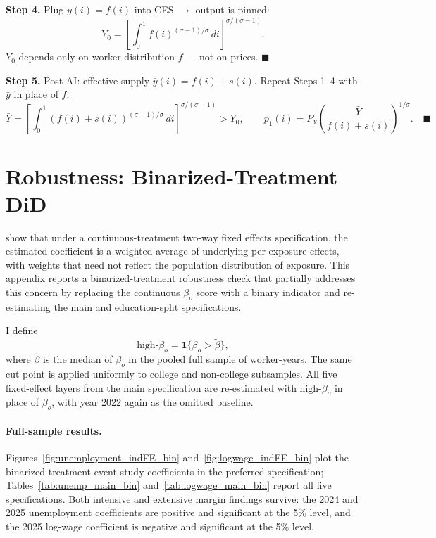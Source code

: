 \documentclass[11pt]{article}
\theoremstyle{plain}
\theoremstyle{remark}
\begin{document}
\noindent\textbf{Step 4.} Plug $y(i)=f(i)$ into CES $\to$ output is pinned:
\[
  Y_0 = \left[\int_0^1 f(i)^{(\sigma-1)/\sigma}\,di
  \right]^{\!\sigma/(\sigma-1)}.
\]
$Y_0$ depends only on worker distribution $f$ --- not on prices. $\blacksquare$

\medskip\noindent\textbf{Step 5.} Post-AI: effective supply
$\bar y(i)=f(i)+s(i)$.  Repeat Steps 1--4 with $\bar y$ in place of $f$:
\[
  \bar Y = \left[\int_0^1 (f(i)+s(i))^{(\sigma-1)/\sigma}\,di
  \right]^{\!\sigma/(\sigma-1)} > Y_0,
  \qquad
  p_1(i) = P_Y\!\left(\frac{\bar Y}{f(i)+s(i)}\right)^{\!1/\sigma}.
  \quad\blacksquare
\]


\clearpage
\section{Robustness: Binarized-Treatment DiD}
\label{app:robustness}

\textcite{callaway2024continuous} show that under a continuous-treatment two-way fixed effects specification, the estimated coefficient is a weighted average of underlying per-exposure effects, with weights that need not reflect the population distribution of exposure.  This appendix reports a binarized-treatment robustness check that partially addresses this concern by replacing the continuous $\beta_o$ score with a binary indicator and re-estimating the main and education-split specifications.

I define
\begin{equation*}
  \text{high-}\beta_o = \mathbf{1}\{\beta_o > \widetilde{\beta}\},
\end{equation*}
where $\widetilde{\beta}$ is the median of $\beta_o$ in the pooled full sample of worker-years.  The same cut point is applied uniformly to college and non-college subsamples.  All five fixed-effect layers from the main specification are re-estimated with $\text{high-}\beta_o$ in place of $\beta_o$, with year 2022 again as the omitted baseline.

\paragraph{Full-sample results.}
Figures~\ref{fig:unemployment_indFE_bin} and~\ref{fig:logwage_indFE_bin} plot the binarized-treatment event-study coefficients in the preferred specification; Tables~\ref{tab:unemp_main_bin} and~\ref{tab:logwage_main_bin} report all five specifications.  Both intensive and extensive margin findings survive: the 2024 and 2025 unemployment coefficients are positive and significant at the 5\% level, and the 2025 log-wage coefficient is negative and significant at the 5\% level.
\end{document}
